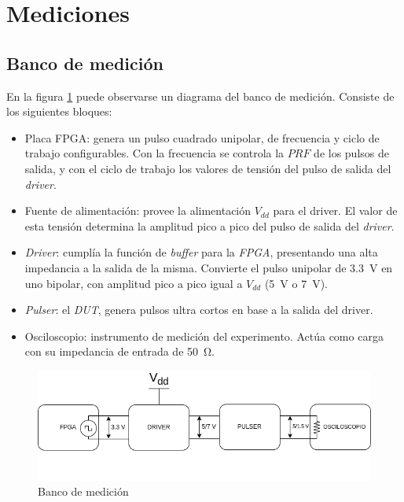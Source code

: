 \section{Mediciones}

\subsection{Banco de medición}

En la figura \ref{fig:banco_medicion} puede observarse un diagrama del banco de
medición. Consiste de los siguientes bloques:

\begin{itemize}
    \item Placa FPGA: genera un pulso cuadrado unipolar, de frecuencia y ciclo
      de trabajo configurables. Con la frecuencia se controla la $PRF$ de los
      pulsos de salida, y con el ciclo de trabajo los valores de tensión del
      pulso de salida del \textit{driver}.
    \item Fuente de alimentación: provee la alimentación $V_{dd}$ para el
      driver. El valor de esta tensión determina la amplitud pico a pico del
      pulso de salida del \textit{driver}.
    \item \textit{Driver}: cumplía la función de \textit{buffer} para la
      \textit{FPGA}, presentando una alta impedancia a la salida de la misma.
      Convierte el pulso unipolar de \qty{3.3}{\volt} en uno bipolar, con
      amplitud pico a pico igual a $V_{dd}$ (\qty{5}{\volt} o \qty{7}{\volt}).
    \item \textit{Pulser}: el \textit{DUT}, genera pulsos ultra cortos en base 
      a la salida del driver.
    \item Osciloscopio: instrumento de medición del experimento. Actúa como
      carga con su impedancia de entrada de \qty{50}{\ohm}.
\end{itemize}

\begin{figure}
  \centering
    \includegraphics[width=1\textwidth]{images/banco_medicion.drawio.png}
    \caption{Banco de medición}
    \label{fig:banco_medicion}
\end{figure}

